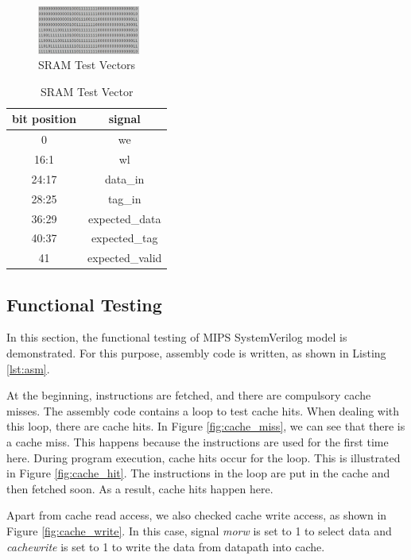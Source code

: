 \documentclass[conference]{IEEEtran}
\begin{document}
\begin{itemize}
\begin{figure}[h!]
  \centering
    \includegraphics[width=0.3\textwidth]{sram_test.png}
  \caption{SRAM Test Vectors}
  \label{fig:sram_test}
\end{figure}

\begin{table}[h]
\centering
\caption{SRAM Test Vector}
\label{table:sram}
\begin{tabular}{c|c}
  \hline
  \textbf{bit position} & \textbf{signal}\\  
  \hline
  0 & we\\
  16:1 & wl \\
  24:17 & data\_in\\
  28:25 & tag\_in\\
  36:29 & expected\_data\\
  40:37 & expected\_tag\\
  41 & expected\_valid\\
  \hline
\end{tabular}
\end{table}

\end{itemize}

\subsection{Functional Testing}\label{subsec:func_test}
In this section, the functional testing of MIPS SystemVerilog model is
demonstrated. For this purpose, assembly code is written, as shown in Listing
\ref{lst:asm}.


At the beginning, instructions are fetched, and there are compulsory cache misses. The assembly code contains a loop to test cache hits. When dealing with this loop, there are cache hits. In Figure \ref{fig:cache_miss}, we can see that there is a cache miss. This happens because the instructions are used for the first time here. During program execution, cache hits occur for the loop. This is illustrated in Figure \ref{fig:cache_hit}. The instructions in the loop are put in the cache and then fetched soon. As a result, cache hits happen here.

Apart from cache read access, we also checked cache write access, as shown in Figure \ref{fig:cache_write}. In this case, signal \textit{morw} is set to 1 to select data and \textit{cachewrite} is set to 1 to write the data from datapath into cache.
\end{document}
